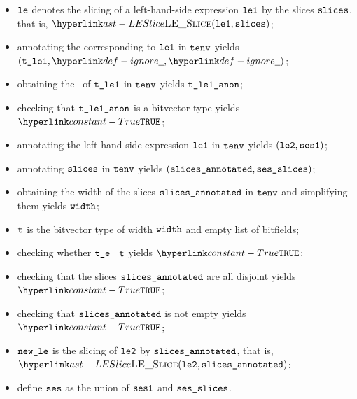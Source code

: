 \ProseParagraph
\AllApply
\begin{itemize}
  \item $\texttt{le}$ denotes the slicing of a left-hand-side expression $\texttt{le1}$ by the slices $\texttt{slices}$, that is, $\LESlice(\vleone, \slices)$;
  \item annotating the \rhsexpression{} corresponding to $\texttt{le1}$ in $\texttt{tenv}$ yields \\
        $(\vtleone, \Ignore, \Ignore)$\ProseOrTypeError;
  \item obtaining the \underlyingtype\ of $\texttt{t\_le1}$ in $\texttt{tenv}$ yields $\texttt{t\_le1\_anon}$\ProseOrTypeError;
  \item checking that $\texttt{t\_le1\_anon}$ is a bitvector type yields $\True$\ProseTerminateAs{\UnexpectedType};
  \item annotating the left-hand-side expression $\texttt{le1}$ in $\texttt{tenv}$ yields $(\texttt{le2}, \texttt{ses1})$\ProseOrTypeError;
  \item annotating $\texttt{slices}$ in $\texttt{tenv}$ yields $(\texttt{slices\_annotated}, \texttt{ses\_slices})$\ProseOrTypeError;
  \item obtaining the width of the slices $\texttt{slices\_annotated}$ in $\texttt{tenv}$ and simplifying them yields $\texttt{width}$;
  \item $\texttt{t}$ is the bitvector type of width $\texttt{width}$ and empty list of bitfields;
  \item checking whether $\texttt{t\_e}$ \typesatisfies\ $\texttt{t}$ yields $\True$\ProseOrTypeError;
  \item checking that the slices $\texttt{slices\_annotated}$ are all disjoint yields $\True$\ProseOrTypeError;
  \item checking that $\texttt{slices\_annotated}$ is not empty yields $\True$\ProseTerminateAs{\BadSlices};
  \item $\texttt{new\_le}$ is the slicing of $\texttt{le2}$ by $\texttt{slices\_annotated}$, that is, $\LESlice(\vletwo, \slicesannotated)$;
  \item define $\texttt{ses}$ as the union of $\texttt{ses1}$ and $\texttt{ses\_slices}$.
\end{itemize}
\FormallyParagraph
